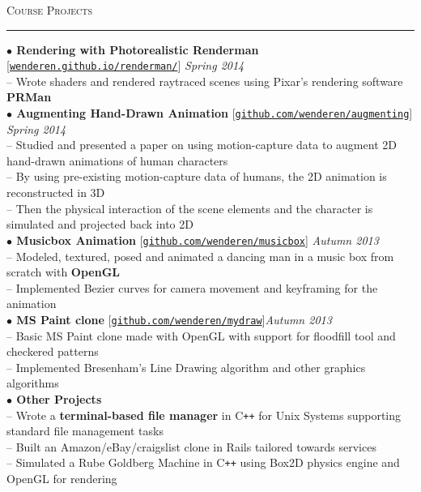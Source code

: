 \documentclass[a4paper,9pt]{article}
\begin{document}
\large{\textsc{Course Projects}}\vspace{1.5pt}
\hrule\vspace{0.25cm}
\small
\textbf{$\bullet$ Rendering with Photorealistic Renderman} [\href{https://wenderen.github.io/renderman/}{\texttt{wenderen.github.io/renderman/}}] \hfill \textit{Spring 2014}\\
-- Wrote shaders and rendered raytraced scenes using Pixar's rendering software \textbf{PRMan}\\
\textbf{$\bullet$ Augmenting Hand-Drawn Animation} [\href{https://github.com/wenderen/augmenting}{\texttt{github.com/wenderen/augmenting}}] \hfill \textit{Spring 2014}\\
-- Studied and presented a paper on using motion-capture data to augment 2D hand-drawn animations of human characters\\
-- By using pre-existing motion-capture data of humans, the 2D animation is reconstructed in 3D\\
-- Then the physical interaction of the scene elements and the character is simulated and projected back into 2D\\
\textbf{$\bullet$ Musicbox Animation} [\href{https://github.com/wenderen/musicbox}{\texttt{github.com/wenderen/musicbox}}] \hfill \textit{Autumn 2013}\\
-- Modeled, textured, posed and animated a dancing man in a music box from scratch with \textbf{OpenGL}\\
-- Implemented Bezier curves for camera movement and keyframing for the animation\\
\textbf{$\bullet$ MS Paint clone} [\href{https://github.com/wenderen/mydraw}{\texttt{github.com/wenderen/mydraw}}]\hfill \textit{Autumn 2013}\\
-- Basic MS Paint clone made with OpenGL with support for floodfill tool and checkered patterns\\
-- Implemented Bresenham's Line Drawing algorithm and other graphics algorithms\\
\textbf{$\bullet$ Other Projects}\\
-- Wrote a \textbf{terminal-based file manager} in C\texttt{++} for Unix Systems supporting standard file management tasks\\
-- Built an Amazon/eBay/craigslist clone in Rails tailored towards services\\
-- Simulated a Rube Goldberg Machine in C\verb!++! using Box2D physics engine and OpenGL for rendering\\
\end{document}
